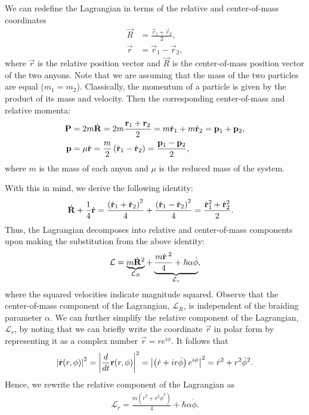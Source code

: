 We can redefine the Lagrangian in terms of the relative and center-of-mass coordinates
\begin{align}
    \vec{R} &= \frac{\vec{r}_1+\vec{r}_2}{2}, \\
    \vec{r} &= \vec{r}_1-\vec{r}_2,
\end{align}
where $\vec{r}$ is the relative position vector and $\vec{R}$ is the center-of-mass position vector of the two anyons. Note that we are assuming that the mass of the two particles are equal ($m_1=m_2$). Classically, the momentum of a particle is given by the product of its mass and velocity. Then the corresponding center-of-mass and relative momenta:
\begin{align}
    \mathbf{P} &= 2m\dot{\mathbf{R}} = 2m \frac{\mathbf{r}_1+\mathbf{r}_2}{2} = m\dot{\mathbf{r}}_1 + m\dot{\mathbf{r}}_2 = \mathbf{p}_1 + \mathbf{p}_2, \\
    \mathbf{p} &= \mu\dot{\mathbf{r}} = \frac{m}{2}\left( \dot{\mathbf{r}}_1-\dot{\mathbf{r}}_2 \right) = \frac{\mathbf{p}_1 - \mathbf{p}_2}{2},
\end{align}
where $m$ is the mass of each anyon and $\mu$ is the reduced mass of the system.

With this in mind, we derive the following identity:
\begin{align}
    \dot{\mathbf{R}} + \frac{1}{4}\dot{\mathbf{r}} &= \frac{{\left( \dot{\mathbf{r}}_1 + \dot{\mathbf{r}}_2 \right)}^2}{4} + \frac{{\left( \dot{\mathbf{r}}_1 - \dot{\mathbf{r}}_2 \right)}^2}{4} = \frac{{\dot{\mathbf{r}}_1}^2 + {\dot{\mathbf{r}}_2}^2}{2}.
\end{align}
Thus, the Lagrangian decomposes into relative and center-of-mass components upon making the substitution from the above identity:
\begin{align}
    \mathcal{L} = \underbrace{m\dot{\mathbf{R}}^2}_{\mathcal{L}_R} + \underbrace{\frac{m{\dot{\mathbf{r}}}^{\;2}}{4} + \hbar\alpha\dot{\phi}}_{\mathcal{L}_r},
\end{align}
where the squared velocities indicate magnitude squared. Observe that the center-of-mass component of the Lagrangian, $\mathcal{L}_R$, is independent of the braiding parameter $\alpha$. We can further simplify the relative component of the Lagrangian, $\mathcal{L}_r$, by noting that we can briefly write the coordinate $\vec{r}$ in polar form by representing it as a complex number $\vec{r} =r e^{i\phi}$. It follows that
\begin{align}
    \left|\dot{\mathbf{r}}(r,\phi)\right|^2 = \left|\frac{d}{dt}\mathbf{r}(r,\phi)\right|^2 = \left|\left( \dot{r} + ir\dot{\phi} \right)e^{i\phi}\right|^2 = \dot{r}^2 + r^2\dot{\phi}^2.
\end{align}
Hence, we rewrite the relative component of the Lagrangian as
\begin{align}
    \mathcal{L}_r = \frac{m\left( \dot{r}^2 + r^2\dot{\phi}^2 \right)}{4} + \hbar\alpha\dot{\phi}.\label{eq:basic_Lr}
\end{align}

